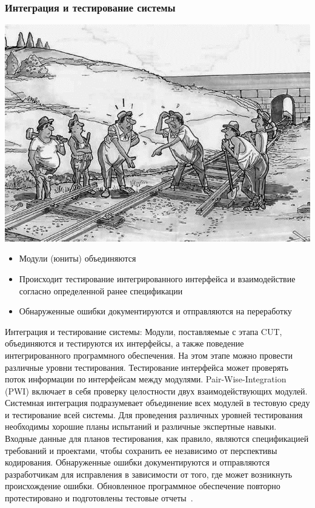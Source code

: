 \documentclass{../industrial-development}
\begin{document}
\begin{frame}\frametitle{Интеграция и тестирование системы}
\centerline{\includegraphics[height=0.5\textheight]{it.png}}
\begin{itemize}
\item Модули (юниты) объединяются
\item Происходит тестирование интегрированного интерфейса и взаимодействие согласно определенной ранее спецификации
\item Обнаруженные ошибки документируются и отправляются  на переработку
\end{itemize}
\end{frame}
\lecturenotes
Интеграция и тестирование системы:
Модули, поставляемые с этапа CUT, объединяются и тестируются их интерфейсы, а также поведение интегрированного программного обеспечения. На этом этапе можно провести различные уровни тестирования. Тестирование интерфейса может проверять поток информации по интерфейсам между модулями. Pair-Wise-Integration (PWI) включает в себя проверку целостности двух взаимодействующих модулей. Системная интеграция подразумевает объединение всех модулей в тестовую среду и тестирование всей системы. Для проведения различных уровней тестирования необходимы хорошие планы испытаний и различные экспертные навыки. Входные данные для планов тестирования, как правило, являются спецификацией требований и проектами, чтобы сохранить ее независимо от перспективы кодирования. Обнаруженные ошибки документируются и отправляются разработчикам для исправления в зависимости от того, где может возникнуть происхождение ошибки. Обновленное программное обеспечение повторно протестировано и подготовлены тестовые отчеты~\cite{SDLC}.
\end{document}
